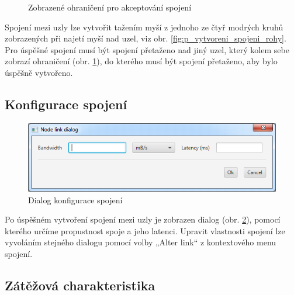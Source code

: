 \documentclass[czech,DP]{thesiskiv}
\begin{document}
\begin{figure}
\centering
\caption{Zobrazené ohraničení pro akceptování spojení}
\label{fig:p_vytvoreni_spojeni_ohraniceni}
\end{figure}

Spojení mezi uzly lze vytvořit tažením myší z jednoho ze čtyř modrých kruhů zobrazených při najetí myší nad uzel, viz obr. \ref{fig:p_vytvoreni_spojeni_rohy}. Pro úspěšné spojení musí být spojení přetaženo nad jiný uzel, který kolem sebe zobrazí ohraničení (obr. \ref{fig:p_vytvoreni_spojeni_ohraniceni}), do kterého musí být spojení přetaženo, aby bylo úspěšně vytvořeno.

\subsection{Konfigurace spojení}

\begin{figure}[H]
\centering
	\includegraphics[width=\textwidth]{img/prirucka/vytvoreni_spojeni_dialog.png}
\caption{Dialog konfigurace spojení}
\label{fig:p_vytvoreni_spojeni_dialog}
\end{figure}

Po úspěšném vytvoření spojení mezi uzly je zobrazen dialog (obr. \ref{fig:p_vytvoreni_spojeni_dialog}), pomocí kterého určíme propustnost spoje a jeho latenci. Upravit vlastnosti spojení lze vyvoláním stejného dialogu pomocí volby „Alter link“ z kontextového menu spojení.

\subsection{Zátěžová charakteristika}
\end{document}
